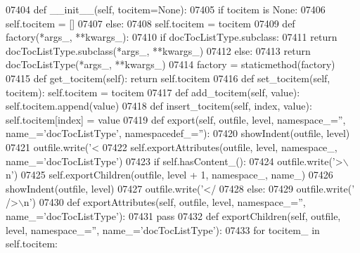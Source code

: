 \begin{DoxyCode}
{{{{{{{{{{{{{{{{{{{{{{{{{{{{{{{{{{{{{{{{{{{{{{{{{{{{{{{{{{{{{{{{{{{{{{{{{{{{{{{{{{{{{{{{{{{{{{{{{{{{{{{{{{{{{{{{{{{{{{{{{{{{{{{{{{{{{{{{{{{{{{{{{{{{{{{{{{{{{{{{{{{{{{{{{{{{{{{{{{{{{{{{{{{{{{{{{{{{{{{{{{{{{{{{{{{{{{{{{{{{{{{{{{{{{{{{{{{{{{{{{{{{{{{{{{{{{{{{{{{{{{{{{{{{{{{{{{{{{{{{{{{{{{{{{{{{{{{{{{{{{{{{{{{{{{{{{{{{{{{{{{{{{{{{{{{{{{{{{{{{{{{{{{{{{{{{{{{{{{{{{{{{{{{{{{{{{{{{{{{{{{{{{{{{{{{{{{{{{{{{{{{{{{{{{{{{{{{{{{{{{{{{{{{{{{{{{{{{{{{{{{{{{{{{{{{{{{{{{{{{{{{{{{{{07404     \textcolor{keyword}{def }__init__(self, tocitem=None):
07405         \textcolor{keywordflow}{if} tocitem \textcolor{keywordflow}{is} \textcolor{keywordtype}{None}:
07406             self.tocitem = []
07407         \textcolor{keywordflow}{else}:
07408             self.tocitem = tocitem
07409     \textcolor{keyword}{def }factory(*args\_, **kwargs\_):
07410         \textcolor{keywordflow}{if} docTocListType.subclass:
07411             \textcolor{keywordflow}{return} docTocListType.subclass(*args\_, **kwargs\_)
07412         \textcolor{keywordflow}{else}:
07413             \textcolor{keywordflow}{return} docTocListType(*args\_, **kwargs\_)
07414     factory = staticmethod(factory)
07415     \textcolor{keyword}{def }get_tocitem(self): \textcolor{keywordflow}{return} self.tocitem
07416     \textcolor{keyword}{def }set_tocitem(self, tocitem): self.tocitem = tocitem
07417     \textcolor{keyword}{def }add_tocitem(self, value): self.tocitem.append(value)
07418     \textcolor{keyword}{def }insert_tocitem(self, index, value): self.tocitem[index] = value
07419     \textcolor{keyword}{def }export(self, outfile, level, namespace\_='', name\_='docTocListType', namespacedef\_=''):
07420         showIndent(outfile, level)
07421         outfile.write(\textcolor{stringliteral}{'<%
07422         self.exportAttributes(outfile, level, namespace\_, name\_=\textcolor{stringliteral}{'docTocListType'})
07423         \textcolor{keywordflow}{if} self.hasContent_():
07424             outfile.write(\textcolor{stringliteral}{'>\(\backslash\)n'})
07425             self.exportChildren(outfile, level + 1, namespace\_, name\_)
07426             showIndent(outfile, level)
07427             outfile.write(\textcolor{stringliteral}{'</%
07428         \textcolor{keywordflow}{else}:
07429             outfile.write(\textcolor{stringliteral}{' />\(\backslash\)n'})
07430     \textcolor{keyword}{def }exportAttributes(self, outfile, level, namespace\_='', name\_='docTocListType'):
07431         \textcolor{keywordflow}{pass}
07432     \textcolor{keyword}{def }exportChildren(self, outfile, level, namespace\_='', name\_='docTocListType'):
07433         \textcolor{keywordflow}{for} tocitem\_ \textcolor{keywordflow}{in} self.tocitem:
}}}}}}}}}}}}}}}}}}}}}}}}}}}}}}}}}}}}}}}}}}}}}}}}}}}}}}}}}}}}}}}}}}}}}}}}}}}}}}}}}}}}}}}}}}}}}}}}}}}}}}}}}}}}}}}}}}}}}}}}}}}}}}}}}}}}}}}}}}}}}}}}}}}}}}}}}}}}}}}}}}}}}}}}}}}}}}}}}}}}}}}}}}}}}}}}}}}}}}}}}}}}}}}}}}}}}}}}}}}}}}}}}}}}}}}}}}}}}}}}}}}}}}}}}}}}}}}}}}}}}}}}}}}}}}}}}}}}}}}}}}}}}}}}}}}}}}}}}}}}}}}}}}}}}}}}}}}}}}}}}}}}}}}}}}}}}}}}}}}}}}}}}}}}}}}}}}}}}}}}}}}}}}}}}}}}}}}}}}}}}}}}}}}}}}}}}}}}}}}}}}}}}}}}}}}}}}}}}}}}}}}}}}}}}}}}}}}}}}}}}}}}}}}}}}}}}}}}}}}}}}}}}}}}}}
\end{DoxyCode}
